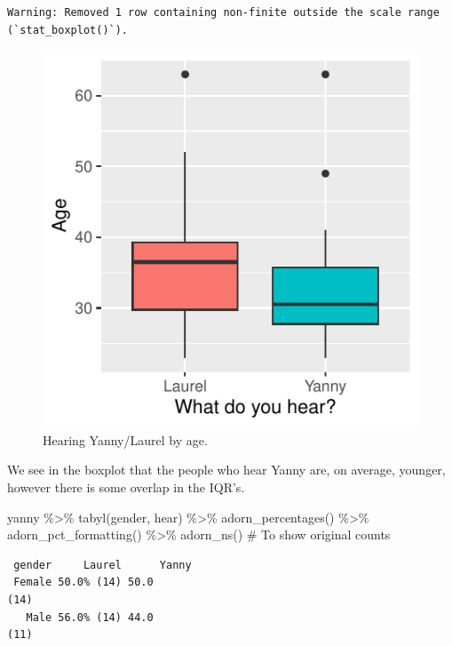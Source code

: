 \documentclass[
  letterpaper,
  DIV=11,
  numbers=noendperiod]{scrartcl}
\newenvironment{Shaded}{\begin{snugshade}}{\end{snugshade}}
\newcommand{\CommentTok}[1]{\textcolor[rgb]{0.37,0.37,0.37}{#1}}
\newcommand{\FunctionTok}[1]{\textcolor[rgb]{0.28,0.35,0.67}{#1}}
\newcommand{\NormalTok}[1]{\textcolor[rgb]{0.00,0.23,0.31}{#1}}
\newcommand{\SpecialCharTok}[1]{\textcolor[rgb]{0.37,0.37,0.37}{#1}}
\begin{document}
\begin{tcolorbox}
\begin{verbatim}
Warning: Removed 1 row containing non-finite outside the scale range
(`stat_boxplot()`).
\end{verbatim}

\begin{figure}[H]

{\centering \includegraphics{about_files/figure-pdf/unnamed-chunk-3-1.pdf}

}

\caption{Hearing Yanny/Laurel by age.}

\end{figure}%

We see in the boxplot that the people who hear Yanny are, on average,
younger, however there is some overlap in the IQR's.

\begin{Shaded}
\begin{Highlighting}[]
\NormalTok{yanny }\SpecialCharTok{\%\textgreater{}\%}
  \FunctionTok{tabyl}\NormalTok{(gender, hear) }\SpecialCharTok{\%\textgreater{}\%}
  \FunctionTok{adorn\_percentages}\NormalTok{() }\SpecialCharTok{\%\textgreater{}\%}
  \FunctionTok{adorn\_pct\_formatting}\NormalTok{() }\SpecialCharTok{\%\textgreater{}\%}
  \FunctionTok{adorn\_ns}\NormalTok{() }\CommentTok{\# To show original counts}
\end{Highlighting}
\end{Shaded}

\begin{verbatim}
 gender     Laurel      Yanny
 Female 50.0% (14) 50.0                                                (14)
   Male 56.0% (14) 44.0                                                (11)
\end{verbatim}


\end{tcolorbox}
\end{document}
